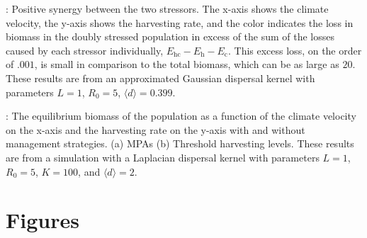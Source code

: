 \documentclass[12pt,english]{article}
\begin{document}
\begin{spacing}{1.9}
: Positive synergy between the two stressors.  The x-axis shows the climate velocity, the y-axis shows the harvesting rate, and the color indicates the loss in biomass in the doubly stressed population in excess of the sum of the losses caused by each stressor individually, $E_\text{hc}-E_\text{h}-E_\text{c}$.  This excess loss, on the order of $.001$, is small in comparison to the total biomass, which can be as large as $20$.  These results are from an approximated Gaussian dispersal kernel with parameters $L=1$, $R_0=5$, $\langle d \rangle = 0.399$.
\hspace{6in}
\hspace{6in}

: The equilibrium biomass of the population as a function of the climate velocity on the x-axis and the harvesting rate on the y-axis with and without management strategies.  (a) MPAs (b) Threshold harvesting levels.  These results are from a simulation with a Laplacian dispersal kernel with parameters $L=1$, $R_0=5$, $K=100$, and $\langle d \rangle =2$.
\pagebreak

\section{Figures}


\end{spacing}
\end{document}
